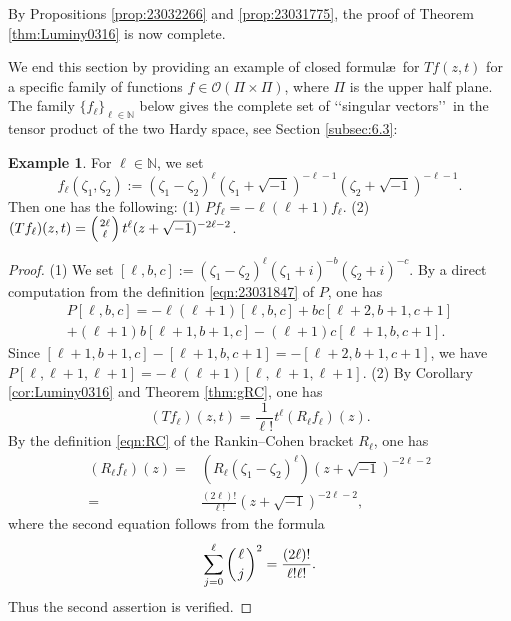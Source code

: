 \documentclass[12pt,leqno]{amsart}
\theoremstyle{plain}
\theoremstyle{definition}
\newtheorem{example}[thm]{Example}
\begin{document}
By Propositions \ref{prop:23032266} and \ref{prop:23031775},
 the proof of Theorem \ref{thm:Luminy0316} is now complete.  



We end this section by providing an example
 of closed formul\ae\ for $T f(z,t)$ for a specific family
 of functions $f \in {\mathcal{O}}(\Pi \times \Pi)$, 
 where $\Pi$ is the upper half plane.  
The family $\{f_{\ell}\}_{\ell \in {\mathbb{N}}}$ below
 gives the complete set 
 of \lq\lq{singular vectors}\rq\rq\ 
 in the tensor product of the two Hardy space, 
 see Section \ref{subsec:6.3}:
\begin{example}
\label{ex:23050410}
For $\ell \in {\mathbb{N}}$, 
 we set 
\begin{equation}
\label{eqn:minKK}
   f_{\ell}(\zeta_1, \zeta_2)
   :=(\zeta_1- \zeta_2)^{\ell}(\zeta_1 + \sqrt{-1})^{-\ell-1}
     (\zeta_2+\sqrt{-1})^{-\ell-1}.  
\end{equation}
Then one has the following:
\newline
{\rm{(1)}}\enspace
$P f_{\ell}=-\ell(\ell+1) f_{\ell}$.  
\newline
{\rm{(2)}}\enspace
$(T f_{\ell})(z,t)=\left({2 \ell} \atop \ell \right)t^{\ell}
(z+\sqrt{-1})^{-2\ell-2}$.  
\end{example}

\begin{proof}
(1)\enspace
We set $[\ell, b, c]:=(\zeta_1-\zeta_2)^{\ell}(\zeta_1+i)^{-b}(\zeta_2+i)^{-c}$. 
By a direct computation from the definition \eqref{eqn:23031847} of $P$, 
 one has 
\begin{multline*}
  P[\ell, b, c]= -\ell(\ell+1)[\ell, b, c]
+b c[\ell+2, b+1, c+1]
\\
+(\ell+1)b[\ell+1, b+1, c] -(\ell+1)c[\ell+1, b, c+1].  
\end{multline*}
Since $[\ell+1, b+1, c]-[\ell+1, b, c+1]=-[\ell+2, b+1, c+1]$, 
 we have $P[\ell, \ell+1, \ell+1]=-\ell(\ell+1)[\ell, \ell+1, \ell+1]$.  
\newline
(2)\enspace
By Corollary \ref{cor:Luminy0316} and Theorem \ref{thm:gRC}, 
 one has
\[
  (T f_{\ell})(z, t)= \frac{1}{\ell !}t^{\ell}(R_{\ell}f_{\ell})(z).  
\]
By the definition \eqref{eqn:RC} of the Rankin--Cohen bracket $R_{\ell}$, 
 one has
\begin{align*}
  (R_{\ell}f_{\ell})(z)
=&(R_{\ell} (\zeta_1-\zeta_2)^{\ell})(z + \sqrt{-1})^{-2 \ell -2}
\\
=& \frac{(2\ell)!}{\ell!}(z+\sqrt{-1})^{-2\ell-2},
\end{align*}
where the second equation follows from the formula
$$
\sum_{j=0}^\ell \left( \ell \atop j\right)^2=\frac{(2\ell)!}{\ell! \ell!}.
$$
Thus the second assertion is verified.  
\end{proof}
\end{document}
